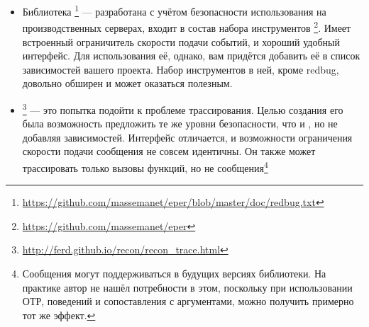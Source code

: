 \begin{itemize}
	\item Библиотека \footnote{\href{https://github.com/massemanet/eper/blob/master/doc/redbug.txt}{https://github.com/massemanet/eper/blob/master/doc/redbug.txt}} --- разработана с учётом безопасности использования на производственных серверах, входит в состав набора инструментов \footnote{\href{https://github.com/massemanet/eper}{https://github.com/massemanet/eper}}. Имеет встроенный ограничитель скорости подачи событий, и хороший удобный интерфейс. Для использования её, однако, вам придётся добавить её в список зависимостей вашего проекта. Набор инструментов в ней, кроме redbug, довольно обширен и может оказаться полезным.
	
	\item {}\footnote{\href{http://ferd.github.io/recon/recon\_trace.html}{http://ferd.github.io/recon/recon\_trace.html}} --- это попытка  подойти к проблеме трассирования. Целью создания его была возможность предложить те же уровни безопасности, что и , но не добавляя зависимостей. Интерфейс отличается, и возможности ограничения скорости подачи сообщения не совсем идентичны. Он также может трассировать только вызовы функций, но не сообщения\footnote{Сообщения могут поддерживаться в будущих версиях библиотеки. На практике автор не нашёл потребности в этом, поскольку при использовании ОТР, поведений и сопоставления с аргументами, можно получить примерно тот же эффект.}
\end{itemize}

